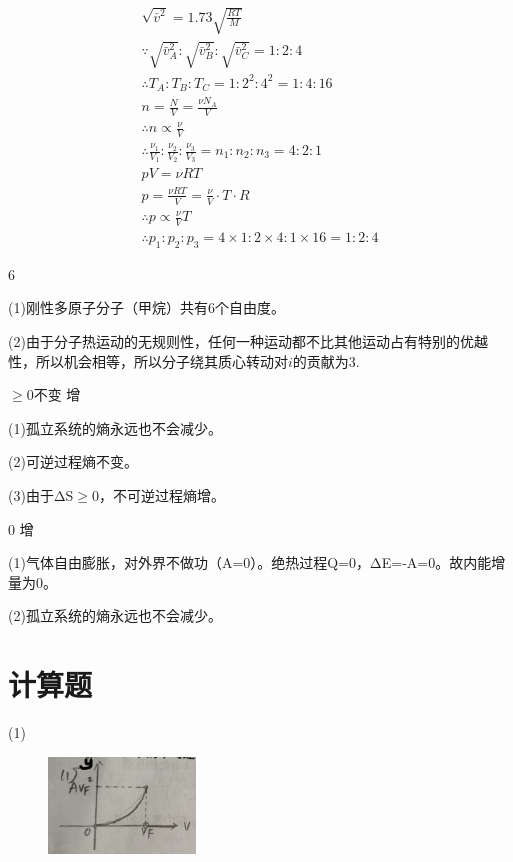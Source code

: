 $$
\begin{array}{*{20}{c}}
 \sqrt { \bar { v } ^ { 2 } } = 1.73 \sqrt { \frac { R T } { M } } \\ \because \sqrt { \bar { v } _ { A } ^ { 2 } } : \sqrt { \bar { v } _ { B } ^ { 2 } }  : \sqrt { \bar { v } _ { C } ^ { 2 } } = 1 : 2 : 4 \\ \therefore T _ { A } : T _ { B } : T _ { C } = 1 : 2 ^ { 2 } : 4 ^ { 2 } = 1 : 4 : 16 \\ n = \frac { N } { V } = \frac { \nu N _ { A } } { V } \\ \therefore n \propto \frac { \nu } { V }\\ \therefore \frac { \nu _ { 1 } } { V _ { 1 } } : \frac { \nu _ { 2 } } { V _ { 2 } } : \frac { \nu _ { 3 } } { V _ { 3 } }  = n _ { 1 } : n _ { 2 } : n _ { 3 } = 4 : 2 : 1 \\ p V  = \nu R T \\ p = \frac { \nu R T } { V }  = \frac { \nu } { V } \cdot T \cdot R \\ \therefore p  \propto \frac { \nu } { V } T \\ \therefore p _ { 1 } : p _ { 2 } : p _ { 3 } = 4 \times 1 : 2 \times 4 : 1 \times 16 = 1 : 2 : 4  
\end{array}
$$

6

\solve (1)刚性多原子分子（甲烷）共有6个自由度。

(2)由于分子热运动的无规则性，任何一种运动都不比其他运动占有特别的优越性，所以机会相等，所以分子绕其质心转动对$i$的贡献为3.

$\geqslant 0 $\qquad 不变 \qquad 增

\solve
(1)孤立系统的熵永远也不会减少。

(2)可逆过程熵不变。

(3)由于ΔS$\geqslant 0$，不可逆过程熵增。


0 \qquad 增

\solve(1)气体自由膨胀，对外界不做功（A=0）。绝热过程Q=0，ΔE=-A=0。故内能增量为0。

(2)孤立系统的熵永远也不会减少。


\section{计算题}

\solve
(1)
\begin{figure}[!ht]
	\centering
	\includegraphics[width=0.35\textwidth]{./pics/Chp12_21.jpg}
\end{figure}

